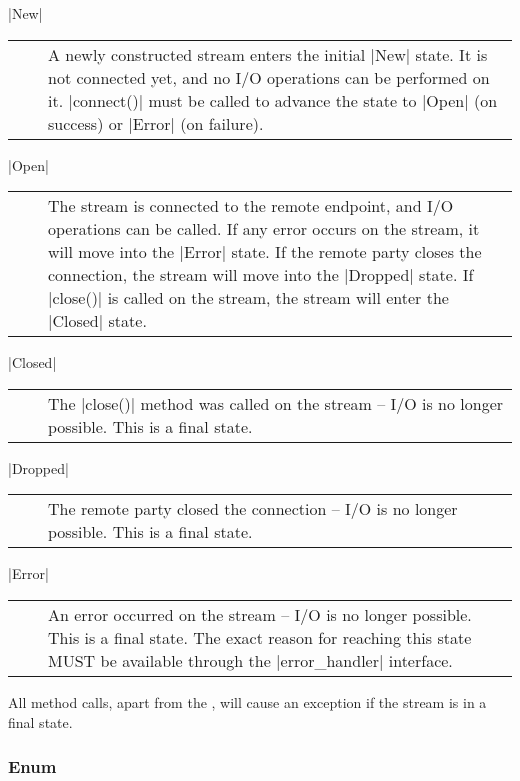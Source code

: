    |New|\\[1.5mm]
   \begin{tabular}{cp{110mm}}
     ~~ & A newly constructed stream enters the initial |New| state.
          It is not connected yet, and no I/O operations can be
          performed on it.   |connect()| must be called to advance
          the state to |Open| (on success) or |Error| (on failure).
   \end{tabular}
 
   |Open|\\[1.5mm]
   \begin{tabular}{cp{110mm}}
     ~~ & The stream is connected to the remote endpoint, and I/O
          operations can be called.  If any error occurs on the
          stream, it will move into the |Error| state.  If the remote
          party closes the connection, the stream will move into the
          |Dropped| state.  If |close()| is called on the stream, the
          stream will enter the |Closed| state.
   
   \end{tabular}
 
   |Closed|\\[1.5mm]
   \begin{tabular}{cp{110mm}}
     ~~ & The |close()| method was called on the stream -- I/O is no
          longer possible.  This is a final state.
   \end{tabular}
 
   |Dropped|\\[1.5mm]
   \begin{tabular}{cp{110mm}}
     ~~ & The remote party closed the connection -- I/O is no longer
          possible.  This is a final state.
   \end{tabular}
 
   |Error|\\[1.5mm]
   \begin{tabular}{cp{110mm}}
     ~~ & An error occurred on the stream -- I/O is no longer
          possible.  This is a final state.  The exact reason for
          reaching this state MUST be available through the
          |error_handler| interface.
   \end{tabular}
 
   All method calls, apart from the , will cause
   an  exception if the stream is in a final
   state.
 
 
  \subsubsection*{Enum }
 
